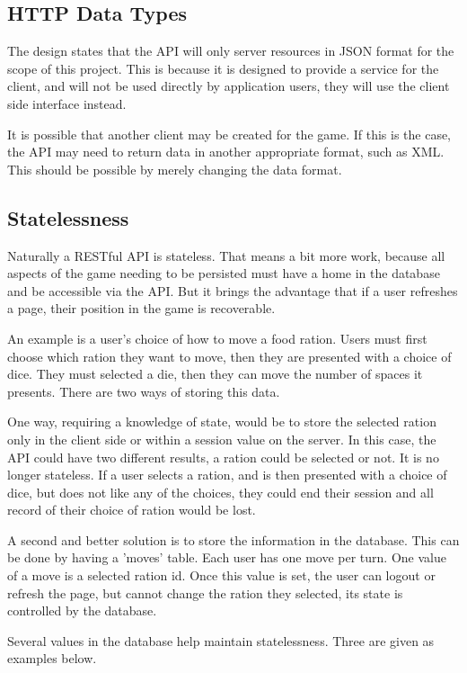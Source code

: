 \subsection{HTTP Data Types}
The design states that the API will only server resources in JSON format for the scope of this project. This is because it is designed to provide a service for the client, and will not be used directly by application users, they will use the client side interface instead.

It is possible that another client may be created for the game. If this is the case, the API may need to return data in another appropriate format, such as XML. This should be possible by merely changing the data format.

\subsection{Statelessness}
Naturally a RESTful API is stateless. That means a bit more work, because all aspects of the game needing to be persisted must have a home in the database and be accessible via the API. But it brings the advantage that if a user refreshes a page, their position in the game is recoverable.

An example is a user's choice of how to move a food ration. Users must first choose which ration they want to move, then they are presented with a choice of dice. They must selected a die, then they can move the number of spaces it presents. There are two ways of storing this data.

One way, requiring a knowledge of state, would be to store the selected ration only in the client side or within a session value on the server. In this case, the API could have two different results, a ration could be selected or not. It is no longer stateless. If a user selects a ration, and is then presented with a choice of dice, but does not like any of the choices, they could end their session and all record of their choice of ration would be lost.

A second and better solution is to store the information in the database. This can be done by having a 'moves' table. Each user has one move per turn. One value of a move is a selected ration id. Once this value is set, the user can logout or refresh the page, but cannot change the ration they selected, its state is controlled by the database.

Several values in the database help maintain statelessness. Three are given as examples below.

